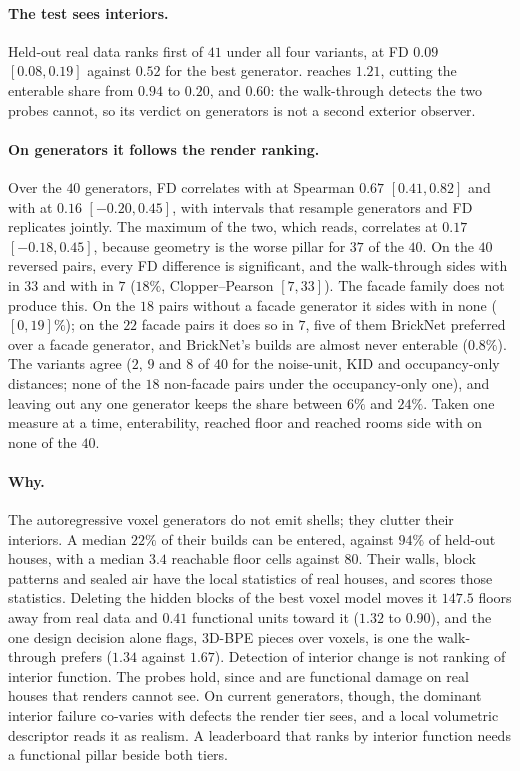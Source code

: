 \paragraph{The test sees interiors.} Held-out real data ranks first of $41$ under all four
variants, at FD $0.09$ $[0.08, 0.19]$ against $0.52$ for the best generator. \solidify{}
reaches $1.21$, cutting the enterable share from $0.94$ to $0.20$, and \hollow{} $0.60$:
the walk-through detects the two probes \mvkid{} cannot, so its verdict on generators is not
a second exterior observer.

\paragraph{On generators it follows the render ranking.} Over the $40$ generators, FD
correlates with \mvkid{} at Spearman $0.67$ $[0.41, 0.82]$ and with \vkid{} at $0.16$
$[-0.20, 0.45]$, with intervals that resample generators and FD replicates jointly. The
maximum of the two, which \blockscore{} reads, correlates at $0.17$ $[-0.18, 0.45]$, because
geometry is the worse pillar for $37$ of the $40$. On the $40$ reversed pairs, every FD
difference is significant, and the walk-through sides with \mvkid{} in $33$ and with \vkid{}
in $7$ ($18\%$, Clopper--Pearson $[7, 33]$). The facade family does not produce this. On the
$18$ pairs without a facade generator it sides with \vkid{} in none ($[0, 19]\%$); on the
$22$ facade pairs it does so in $7$, five of them BrickNet preferred over a facade generator,
and BrickNet's builds are almost never enterable ($0.8\%$). The variants agree ($2$, $9$ and
$8$ of $40$ for the noise-unit, KID and occupancy-only distances; none of the $18$
non-facade pairs under the occupancy-only one), and leaving out any one generator keeps the
share between $6\%$ and $24\%$. Taken one measure at a time, enterability, reached floor and
reached rooms side with \vkid{} on none of the $40$.

\paragraph{Why.} The autoregressive voxel generators do not emit shells; they clutter their
interiors. A median $22\%$ of their builds can be entered, against $94\%$ of held-out houses,
with a median $3.4$ reachable floor cells against $80$. Their walls, block patterns and
sealed air have the local statistics of real houses, and \vkid{} scores those statistics.
Deleting the hidden blocks of the best voxel model moves it $147.5$ \vkid{} floors away from
real data and $0.41$ functional units toward it ($1.32$ to $0.90$), and the one design
decision \vkid{} alone flags, 3D-BPE pieces over voxels, is one the walk-through prefers
($1.34$ against $1.67$). Detection of interior change is not ranking of interior function.
The probes hold, since \solidify{} and \hollow{} are functional damage on real houses that
renders cannot see. On current generators, though, the dominant interior failure co-varies
with defects the render tier sees, and a local volumetric descriptor reads it as realism. A
leaderboard that ranks by interior function needs a functional pillar beside both tiers.

